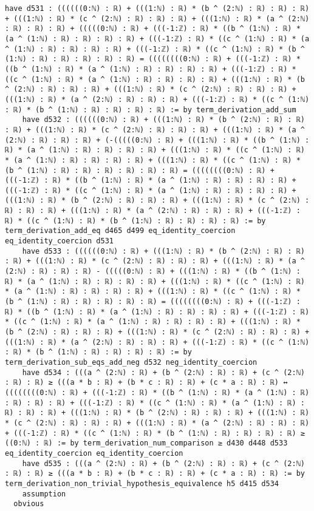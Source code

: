 \documentclass{article}
\begin{document}
\begin{tcolorbox}[colback=white!10, width=\linewidth]
\begin{lstlisting}[language=Lean4]
    have d531 : ((((((0:ℕ) : ℝ) + (((1:ℕ) : ℝ) * (b ^ (2:ℕ) : ℝ) : ℝ) : ℝ) + (((1:ℕ) : ℝ) * (c ^ (2:ℕ) : ℝ) : ℝ) : ℝ) + (((1:ℕ) : ℝ) * (a ^ (2:ℕ) : ℝ) : ℝ) : ℝ) + (((((0:ℕ) : ℝ) + (((-1:ℤ) : ℝ) * ((b ^ (1:ℕ) : ℝ) * (a ^ (1:ℕ) : ℝ) : ℝ) : ℝ) : ℝ) + (((-1:ℤ) : ℝ) * ((c ^ (1:ℕ) : ℝ) * (a ^ (1:ℕ) : ℝ) : ℝ) : ℝ) : ℝ) + (((-1:ℤ) : ℝ) * ((c ^ (1:ℕ) : ℝ) * (b ^ (1:ℕ) : ℝ) : ℝ) : ℝ) : ℝ) : ℝ) = ((((((((0:ℕ) : ℝ) + (((-1:ℤ) : ℝ) * ((b ^ (1:ℕ) : ℝ) * (a ^ (1:ℕ) : ℝ) : ℝ) : ℝ) : ℝ) + (((-1:ℤ) : ℝ) * ((c ^ (1:ℕ) : ℝ) * (a ^ (1:ℕ) : ℝ) : ℝ) : ℝ) : ℝ) + (((1:ℕ) : ℝ) * (b ^ (2:ℕ) : ℝ) : ℝ) : ℝ) + (((1:ℕ) : ℝ) * (c ^ (2:ℕ) : ℝ) : ℝ) : ℝ) + (((1:ℕ) : ℝ) * (a ^ (2:ℕ) : ℝ) : ℝ) : ℝ) + (((-1:ℤ) : ℝ) * ((c ^ (1:ℕ) : ℝ) * (b ^ (1:ℕ) : ℝ) : ℝ) : ℝ) : ℝ) := by term_derivation_add_sum
    have d532 : ((((((0:ℕ) : ℝ) + (((1:ℕ) : ℝ) * (b ^ (2:ℕ) : ℝ) : ℝ) : ℝ) + (((1:ℕ) : ℝ) * (c ^ (2:ℕ) : ℝ) : ℝ) : ℝ) + (((1:ℕ) : ℝ) * (a ^ (2:ℕ) : ℝ) : ℝ) : ℝ) + (-(((((0:ℕ) : ℝ) + (((1:ℕ) : ℝ) * ((b ^ (1:ℕ) : ℝ) * (a ^ (1:ℕ) : ℝ) : ℝ) : ℝ) : ℝ) + (((1:ℕ) : ℝ) * ((c ^ (1:ℕ) : ℝ) * (a ^ (1:ℕ) : ℝ) : ℝ) : ℝ) : ℝ) + (((1:ℕ) : ℝ) * ((c ^ (1:ℕ) : ℝ) * (b ^ (1:ℕ) : ℝ) : ℝ) : ℝ) : ℝ) : ℝ) : ℝ) = ((((((((0:ℕ) : ℝ) + (((-1:ℤ) : ℝ) * ((b ^ (1:ℕ) : ℝ) * (a ^ (1:ℕ) : ℝ) : ℝ) : ℝ) : ℝ) + (((-1:ℤ) : ℝ) * ((c ^ (1:ℕ) : ℝ) * (a ^ (1:ℕ) : ℝ) : ℝ) : ℝ) : ℝ) + (((1:ℕ) : ℝ) * (b ^ (2:ℕ) : ℝ) : ℝ) : ℝ) + (((1:ℕ) : ℝ) * (c ^ (2:ℕ) : ℝ) : ℝ) : ℝ) + (((1:ℕ) : ℝ) * (a ^ (2:ℕ) : ℝ) : ℝ) : ℝ) + (((-1:ℤ) : ℝ) * ((c ^ (1:ℕ) : ℝ) * (b ^ (1:ℕ) : ℝ) : ℝ) : ℝ) : ℝ) := by term_derivation_add_eq d465 d499 eq_identity_coercion eq_identity_coercion d531
    have d533 : ((((((0:ℕ) : ℝ) + (((1:ℕ) : ℝ) * (b ^ (2:ℕ) : ℝ) : ℝ) : ℝ) + (((1:ℕ) : ℝ) * (c ^ (2:ℕ) : ℝ) : ℝ) : ℝ) + (((1:ℕ) : ℝ) * (a ^ (2:ℕ) : ℝ) : ℝ) : ℝ) - (((((0:ℕ) : ℝ) + (((1:ℕ) : ℝ) * ((b ^ (1:ℕ) : ℝ) * (a ^ (1:ℕ) : ℝ) : ℝ) : ℝ) : ℝ) + (((1:ℕ) : ℝ) * ((c ^ (1:ℕ) : ℝ) * (a ^ (1:ℕ) : ℝ) : ℝ) : ℝ) : ℝ) + (((1:ℕ) : ℝ) * ((c ^ (1:ℕ) : ℝ) * (b ^ (1:ℕ) : ℝ) : ℝ) : ℝ) : ℝ) : ℝ) = ((((((((0:ℕ) : ℝ) + (((-1:ℤ) : ℝ) * ((b ^ (1:ℕ) : ℝ) * (a ^ (1:ℕ) : ℝ) : ℝ) : ℝ) : ℝ) + (((-1:ℤ) : ℝ) * ((c ^ (1:ℕ) : ℝ) * (a ^ (1:ℕ) : ℝ) : ℝ) : ℝ) : ℝ) + (((1:ℕ) : ℝ) * (b ^ (2:ℕ) : ℝ) : ℝ) : ℝ) + (((1:ℕ) : ℝ) * (c ^ (2:ℕ) : ℝ) : ℝ) : ℝ) + (((1:ℕ) : ℝ) * (a ^ (2:ℕ) : ℝ) : ℝ) : ℝ) + (((-1:ℤ) : ℝ) * ((c ^ (1:ℕ) : ℝ) * (b ^ (1:ℕ) : ℝ) : ℝ) : ℝ) : ℝ) := by term_derivation_sub_eqs_add_neg d532 neg_identity_coercion
    have d534 : (((a ^ (2:ℕ) : ℝ) + (b ^ (2:ℕ) : ℝ) : ℝ) + (c ^ (2:ℕ) : ℝ) : ℝ) ≥ (((a * b : ℝ) + (b * c : ℝ) : ℝ) + (c * a : ℝ) : ℝ) ↔ ((((((((0:ℕ) : ℝ) + (((-1:ℤ) : ℝ) * ((b ^ (1:ℕ) : ℝ) * (a ^ (1:ℕ) : ℝ) : ℝ) : ℝ) : ℝ) + (((-1:ℤ) : ℝ) * ((c ^ (1:ℕ) : ℝ) * (a ^ (1:ℕ) : ℝ) : ℝ) : ℝ) : ℝ) + (((1:ℕ) : ℝ) * (b ^ (2:ℕ) : ℝ) : ℝ) : ℝ) + (((1:ℕ) : ℝ) * (c ^ (2:ℕ) : ℝ) : ℝ) : ℝ) + (((1:ℕ) : ℝ) * (a ^ (2:ℕ) : ℝ) : ℝ) : ℝ) + (((-1:ℤ) : ℝ) * ((c ^ (1:ℕ) : ℝ) * (b ^ (1:ℕ) : ℝ) : ℝ) : ℝ) : ℝ) ≥ ((0:ℕ) : ℝ) := by term_derivation_num_comparison ≥ d430 d448 d533 eq_identity_coercion eq_identity_coercion
    have d535 : (((a ^ (2:ℕ) : ℝ) + (b ^ (2:ℕ) : ℝ) : ℝ) + (c ^ (2:ℕ) : ℝ) : ℝ) ≥ (((a * b : ℝ) + (b * c : ℝ) : ℝ) + (c * a : ℝ) : ℝ) := by term_derivation_non_trivial_hypothesis_equivalence h5 d415 d534
    assumption
  obvious


\end{lstlisting}
\end{tcolorbox}
\end{document}
